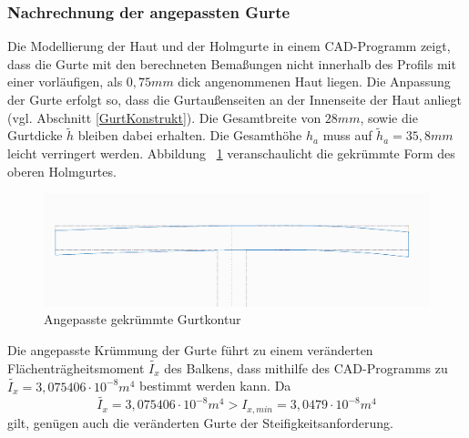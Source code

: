 \subsubsection{Nachrechnung der angepassten Gurte} \label{NachrechnungGurte}
 Die Modellierung der Haut und der Holmgurte in einem CAD-Programm zeigt, dass die Gurte mit den berechneten Bemaßungen nicht innerhalb des Profils mit einer vorläufigen, als $ 0,75mm $ dick angenommenen Haut liegen. Die Anpassung der Gurte erfolgt so, dass die Gurtaußenseiten an der Innenseite der Haut anliegt (vgl. Abschnitt \ref{GurtKonstrukt}). Die Gesamtbreite von $ 28mm $, sowie die Gurtdicke $ \tilde{h} $ bleiben dabei erhalten. Die Gesamthöhe $ h_{a} $ muss auf $ \tilde{h}_{a}=35,8mm $ leicht verringert werden. Abbildung ~\ref{fig: KrummerGurt} veranschaulicht die gekrümmte Form des oberen Holmgurtes.
 \begin{figure}[h]
 	\includegraphics[width=1.0\textwidth]{Bilder/KrummerGurt.jpg}
 	\caption{Angepasste gekrümmte Gurtkontur}
 	\label{fig: KrummerGurt}
 \end{figure}

\noindent Die angepasste Krümmung der Gurte führt zu einem veränderten Flächenträgheitsmoment $ \tilde{I_{x}} $ des Balkens, dass mithilfe des CAD-Programms zu $ \tilde{I_{x}}=3,075406\cdot 10^{-8}m^{4} $ bestimmt werden kann. Da 
\begin{equation}
	\label{IVergleich}
	\tilde{I_{x}}=3,075406\cdot 10^{-8}m^{4} > I_{x,min}=3,0479\cdot 10^{-8}m^{4}
\end{equation}
gilt, genügen auch die veränderten Gurte der Steifigkeitsanforderung.\\
 
